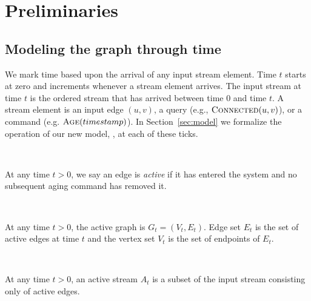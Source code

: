 

\section{Preliminaries}
\subsection{Modeling the graph through time}
We mark time based upon the arrival of any input stream element.  Time $t$
starts at zero and increments whenever a stream element arrives.
The input stream at time $t$ is the ordered stream that has arrived between
time $0$ and time $t$.
A stream element is an input edge $(u,v)$, a query (e.g., $\Call{Connected}{u,v}$), or a command (e.g. $\Call{Age}{timestamp}$).
In Section~\ref{sec:model} we formalize the operation
of our new model, \emph{\XStreamns}, at each of these ticks.
\begin{definition} 
\label{def:active}
\begin{tcolorbox}
\begin{description} 
\item \
\item[{\bf Active Edge:}] At any time $t > 0$, we say an edge is {\em active} if it has entered the system and no subsequent aging command has removed it. 
\item \
\item[{\bf Active Graph}:]
At any time $t > 0$, the active graph is $G_t = (V_t, E_t)$. Edge set $E_t$
is the set of active edges at time $t$ and the vertex set $V_t$ is the
set of endpoints of $E_t$.
\item \
\item[{\bf Active Stream}:] At any time $t > 0$, an active stream $A_t$ is
a subset of the input stream consisting only of active edges. 
\end{description}
\end{tcolorbox}
\end{definition}


